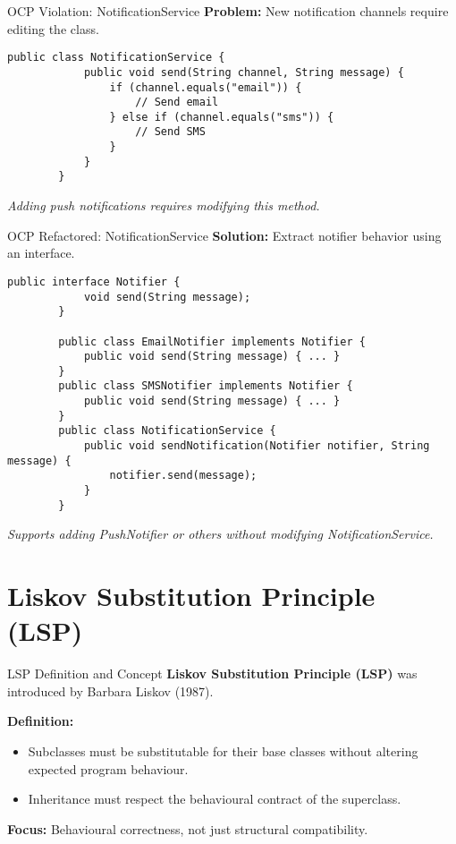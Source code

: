 \documentclass[aspectratio=169, table]{beamer}
\begin{document}
\begin{frame}[fragile]{OCP Violation: NotificationService}
	\vspace{20pt}
	\textbf{Problem:} New notification channels require editing the class.
	\begin{lstlisting}[style=JavaStyle]
		public class NotificationService {
			public void send(String channel, String message) {
				if (channel.equals("email")) {
					// Send email
				} else if (channel.equals("sms")) {
					// Send SMS
				}
			}
		}
	\end{lstlisting}
	\textit{Adding push notifications requires modifying this method.}
\end{frame}

\begin{frame}[fragile]{OCP Refactored: NotificationService}
	\vspace{20pt}
	\textbf{Solution:} Extract notifier behavior using an interface.
	\begin{lstlisting}[style=JavaStyle]
		public interface Notifier {
			void send(String message);
		}
		
		public class EmailNotifier implements Notifier {
			public void send(String message) { ... }
		}
		public class SMSNotifier implements Notifier {
			public void send(String message) { ... }
		}
		public class NotificationService {
			public void sendNotification(Notifier notifier, String message) {
				notifier.send(message);
			}
		}
	\end{lstlisting}
	\textit{Supports adding PushNotifier or others without modifying NotificationService.}
\end{frame}

\section{Liskov Substitution Principle (LSP)}

\begin{frame}[fragile]{LSP Definition and Concept}
	\vspace{20pt}
	\textbf{Liskov Substitution Principle (LSP)} was introduced by Barbara Liskov (1987).
	
	\textbf{Definition:}
	\begin{itemize}
		\item Subclasses must be substitutable for their base classes without altering expected program behaviour.
		\item Inheritance must respect the behavioural contract of the superclass.
	\end{itemize}
	
	\textbf{Focus:} Behavioural correctness, not just structural compatibility.
\end{frame}
\end{document}
